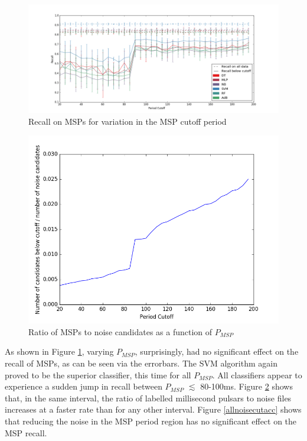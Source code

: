\documentclass[12pt]{article}
\begin{document}
\begin{figure}[h!]
\begin{center}
\includegraphics[scale=0.3]{acc_vs_period_v2_zoom.png}
\caption{Recall on MSPs for variation in the MSP cutoff period}
\label{allnoiseacc}
\end{center}
\end{figure}

\begin{figure}[h!]
\begin{center}
\includegraphics[scale=0.5]{noise_ratio_vs_period_cutoff_zoom.png}
\caption{Ratio of MSPs to noise candidates as a function of $P_{MSP}$}
\label{noiseratiocutoff}
\end{center}
\end{figure}

As shown in Figure \ref{allnoiseacc}, varying $P_{MSP}$, surprisingly, had no significant effect on the recall of MSPs, as can be seen via the errorbars. The SVM algorithm again proved to be the superior classifier, this time for all $P_{MSP}$. All classifiers appear to experience a sudden jump in recall between $P_{MSP}$ $\lesssim$ 80-100ms. Figure \ref{noiseratiocutoff} shows that, in the same interval, the ratio of labelled millisecond pulsars to noise files increases at a faster rate than for any other interval. Figure \ref{allnoisecutacc} shows that reducing the noise in the MSP period region has no significant effect on the MSP recall.
\end{document}
